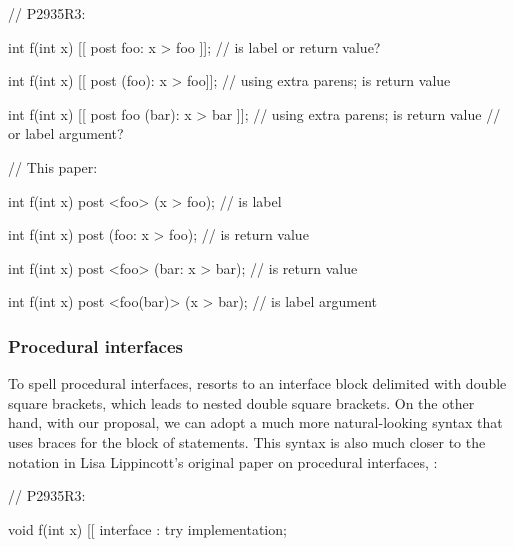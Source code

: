 \begin{minipage}[t]{8cm}
\begin{codeblock}
// P2935R3:

int f(int x)
  [[ post foo: x > foo ]];  
  // is  label or return value?

int f(int x)
  [[ post (foo): x > foo]];  
  // using extra parens;  is return value

int f(int x)
  [[ post foo (bar): x > bar ]];  
  // using extra parens; is  return value
  // or label argument?
\end{codeblock}
\end{minipage}
\begin{minipage}[t]{8cm}
\begin{codeblock}
// This paper:

int f(int x)
  post <foo> (x > foo);
  //  is label

int f(int x)
  post (foo: x > foo);
  //  is return value

int f(int x)
  post <foo> (bar: x > bar); 
  //   is return value

int f(int x)
  post <foo(bar)> (x > bar);
  //  is label argument
\end{codeblock}
\end{minipage}

\subsubsection{Procedural interfaces}
\label{subsubsec:comp_interfaces}

To spell procedural interfaces, \cite{P2935R3} resorts to an interface block delimited with double square brackets, which leads to nested double square brackets. On the other hand, with our proposal, we can adopt a much more natural-looking syntax that uses braces for the block of statements. This syntax is also much closer to the notation in Lisa Lippincott's original paper on procedural interfaces, \cite{P0465R0}:

\begin{minipage}{8cm}
\begin{codeblock}
// P2935R3:

void f(int x)
  [[ interface :
    try {
      implementation;
    }
\end{codeblock}
\end{minipage}
\begin{minipage}{8cm}
\begin{codeblock}
// This paper:

void f(int x)
interface {
  try {
    implementation;
  }
\end{codeblock}
\end{minipage}


